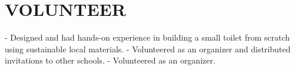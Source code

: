\section{VOLUNTEER}
- Designed and had hands-on experience in building a small toilet from scratch using sustainable local materials.
\entryVSpace
{}
- Volunteered as an organizer and distributed invitations to other schools.
\entryVSpace
{}
- Volunteered as an organizer.
\entryVSpace
\sectionsep